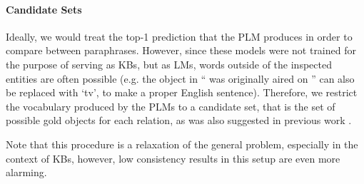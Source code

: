 \paragraph{Candidate Sets}
Ideally, we would treat the top-1 prediction that the PLM produces in order to compare between paraphrases. However, since these models were not trained for the purpose of serving as KBs, but as LMs, words outside of the inspected entities are often possible (e.g. the object in ``\subj{} was originally aired on \obj{}'' can also be replaced with `tv', to make a proper English sentence).
Therefore, we restrict the vocabulary produced by the PLMs to a candidate set, that is the set of possible gold objects for each relation, as was also suggested in previous work \cite{Xiong2020Pretrained, nora}.

Note that this procedure is a relaxation of the general problem, especially in the context of KBs, however, low consistency results in this setup are even more alarming.
